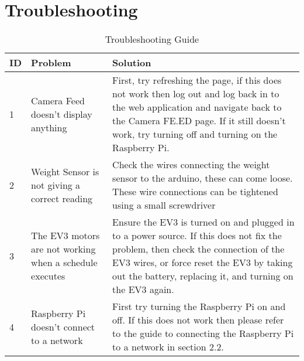 \section{Troubleshooting}

\begin{table}[h!]
            \centering
             \begin{tabular}{||p{1cm} | p{4cm} | p{7cm}||} 
             \hline \hline
             ID & Problem & Solution \\ [0.5ex] 
             \hline\hline
            1 & Camera Feed doesn’t display anything  & First, try refreshing the page, if this does not work then log out and log back in to the web application and navigate back to the Camera FE.ED page. If it still doesn’t work, try turning off and turning on the Raspberry Pi.   \\ [1ex] \hline 
             2 & Weight Sensor is not giving a correct reading & Check the wires connecting the weight sensor to the arduino, these can come loose. These wire connections can be tightened using a small screwdriver  \\ [1ex] \hline 
             3 & The EV3 motors are not working when a schedule executes & Ensure the EV3 is turned on and plugged in to a power source. If this does not fix the problem, then check the connection of the EV3 wires, or force reset the EV3 by taking out the battery, replacing it, and turning on the EV3 again. \\ [1ex] \hline 
             4 & 
Raspberry Pi doesn’t connect to a network
 & 
First try turning the Raspberry Pi on and off. If this does not work then please refer to the guide to connecting the Raspberry Pi to a network in section 2.2.
  \\ [1ex]  \hline 
             \hline 
             \end{tabular}
             \caption{Troubleshooting Guide}
        \end{table}
        